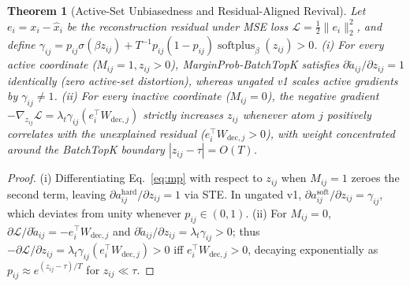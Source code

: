 \documentclass[10pt,twocolumn]{article}
\newtheorem{theorem}{Theorem}
\begin{document}
\begin{theorem}[Active-Set Unbiasedness and Residual-Aligned Revival]
Let $e_i = x_i - \hat{x}_i$ be the reconstruction residual under MSE loss $\mathcal{L} = \frac{1}{2}\|e_i\|_2^2$, and define $\gamma_{ij} = p_{ij}\sigma(\beta z_{ij}) + T^{-1} p_{ij}(1-p_{ij})\operatorname{softplus}_\beta(z_{ij}) > 0$.
(i) For every active coordinate ($M_{ij}=1, z_{ij}>0$), MarginProb-BatchTopK satisfies $\partial \tilde{a}_{ij}/\partial z_{ij} = 1$ identically (zero active-set distortion), whereas ungated v1 scales active gradients by $\gamma_{ij} \ne 1$.
(ii) For every inactive coordinate ($M_{ij}=0$), the negative gradient $-\nabla_{z_{ij}}\mathcal{L} = \lambda_t \gamma_{ij} (e_i^\top W_{\mathrm{dec},j})$ strictly increases $z_{ij}$ whenever atom $j$ positively correlates with the unexplained residual ($e_i^\top W_{\mathrm{dec},j} > 0$), with weight concentrated around the BatchTopK boundary $|z_{ij} - \tau| = O(T)$.
\end{theorem}
\begin{proof}
(i) Differentiating Eq.~\eqref{eq:mp} with respect to $z_{ij}$ when $M_{ij}=1$ zeroes the second term, leaving $\partial a_{ij}^{\mathrm{hard}}/\partial z_{ij} = 1$ via STE. In ungated v1, $\partial a_{ij}^{\mathrm{soft}}/\partial z_{ij} = \gamma_{ij}$, which deviates from unity whenever $p_{ij} \in (0,1)$.
(ii) For $M_{ij}=0$, $\partial \mathcal{L}/\partial \tilde{a}_{ij} = -e_i^\top W_{\mathrm{dec},j}$ and $\partial \tilde{a}_{ij}/\partial z_{ij} = \lambda_t \gamma_{ij} > 0$; thus $-\partial \mathcal{L}/\partial z_{ij} = \lambda_t \gamma_{ij}(e_i^\top W_{\mathrm{dec},j}) > 0$ iff $e_i^\top W_{\mathrm{dec},j} > 0$, decaying exponentially as $p_{ij} \approx e^{(z_{ij}-\tau)/T}$ for $z_{ij} \ll \tau$.
\end{proof}
\end{document}
